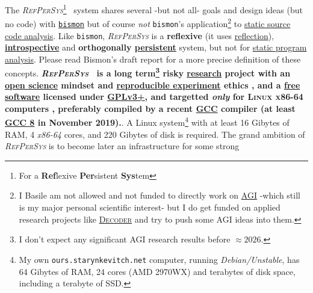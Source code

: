 \documentclass[11pt,a4paper,svgnames]{article}
\newcommand{\RefPerSys}{{\textit{\textsc{RefPerSys}}}}
\begin{document}
The \RefPerSys\footnote{For a \textbf{Ref}lexive \textbf{Per}sistent
\textbf{Sys}tem}~ system shares several -but not all- goals and design
ideas (but no code) with
\href{http://github.com/bstarynk/bismon}{\texttt{bismon}}
\cite{Starynkevitch:2019:bismon-draft} but of course \emph{not}
\texttt{bismon}'s application\footnote{I Basile am not allowed and not
funded to directly work on
\href{https://en.wikipedia.org/wiki/Artificial_general_intelligence}{AGI}
-which still is my major personal scientific interest- but I do get
funded on applied research projects like
\href{https://www.decoder-project.eu/}{\textsc{Decoder}} and try to
push some AGI ideas into them.} to
\href{https://en.wikipedia.org/wiki/Static_program_analysis}{static
  source code analysis}. Like \texttt{bismon}, {\RefPerSys} is a
\textbf{reflexive} (it uses
\href{https://en.wikipedia.org/wiki/Reflection_(computer_programming)}{reflection}),
\textbf{\href{https://en.wikipedia.org/wiki/Virtual\_machine\_introspection}{introspective}}
and \textbf{orthogonally
  \href{https://en.wikipedia.org/wiki/Persistence_(computer_science)}{persistent}}
system, but not for
\href{https://en.wikipedia.org/wiki/Static_program_analysis}{static
  program analysis}. Please read Bismon's draft report
\cite{Starynkevitch:2019:bismon-draft} for a more precise definition
of these concepts. \textbf{\RefPerSys~ is a long term\footnote{I don't
  expect any significant AGI research results before $\approx 2026$.}
  risky \href{https://en.wikipedia.org/wiki/Research}{research}
  project with an
  \href{https://en.wikipedia.org/wiki/Open_science}{open science}
  mindset and
  \href{https://ropensci.github.io/reproducibility-guide/sections/introduction/}{reproducible
    experiment} ethics \cite{zuboff:2015:big-other,
    oneil:2016:weapons}, and a
  \href{https://www.gnu.org/philosophy/free-sw.en.html}{free software}
  licensed under
  \href{https://www.gnu.org/licenses/gpl-3.0.html}{GPLv3+}, and
  targetted \emph{only} for \textsc{Linux x86-64} computers
  \cite{Linux-amd64-ABI:2018}, preferably compiled by a recent
  \href{http://gcc.gnu.org/}{\textsc{GCC}} compiler (at least
  \href{https://gcc.gnu.org/gcc-8/}{\textsc{GCC 8}} in November
  2019).}. A Linux system\footnote{My own
\texttt{ours.starynkevitch.net} computer, running
\textit{Debian/Unstable}, has 64 Gibytes of RAM, 24 cores (AMD 2970WX)
and terabytes of disk space, including a terabyte of SSD.}  with at
least 16 Gibytes of RAM, 4 \textit{x86-64} cores, and 220 Gibytes of
disk is required. The grand ambition of {\RefPerSys} is to become
later an infrastructure for some strong
\end{document}
